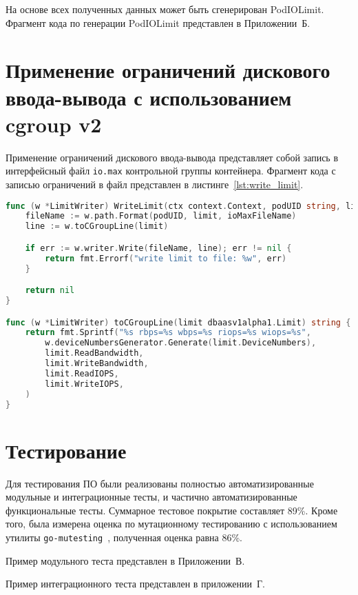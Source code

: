 На основе всех полученных данных может быть сгенерирован PodIOLimit. Фрагмент кода по генерации PodIOLimit представлен в Приложении~Б.

\section{Применение ограничений дискового ввода-вывода с использованием cgroup v2}

Применение ограничений дискового ввода-вывода представляет собой запись в интерфейсный файл \texttt{io.max} контрольной группы контейнера. Фрагмент кода с записью ограничений в файл представлен в листинге~\ref{lst:write_limit}.

\begin{lstlisting}[language=Go,label=lst:write_limit, caption={Запись ограничений в cgroup v2}]
func (w *LimitWriter) WriteLimit(ctx context.Context, podUID string, limit dbaasv1alpha1.Limit) error {
	fileName := w.path.Format(podUID, limit, ioMaxFileName)
	line := w.toCGroupLine(limit)

	if err := w.writer.Write(fileName, line); err != nil {
		return fmt.Errorf("write limit to file: %w", err)
	}

	return nil
}

func (w *LimitWriter) toCGroupLine(limit dbaasv1alpha1.Limit) string {
	return fmt.Sprintf("%s rbps=%s wbps=%s riops=%s wiops=%s",
		w.deviceNumbersGenerator.Generate(limit.DeviceNumbers),
		limit.ReadBandwidth,
		limit.WriteBandwidth,
		limit.ReadIOPS,
		limit.WriteIOPS,
	)
}
\end{lstlisting}

\section{Тестирование}

Для тестирования ПО были реализованы полностью автоматизированные модульные и интеграционные тесты, и частично автоматизированные функциональные тесты. Суммарное тестовое покрытие составляет 89\%. Кроме того, была измерена оценка по мутационному тестированию с использованием утилиты \texttt{go-mutesting}~\cite{mutesting}, полученная оценка равна 86\%.

Пример модульного теста представлен в Приложении~В.

Пример интеграционного теста представлен в приложении~Г.
